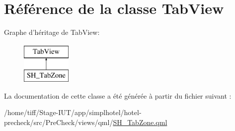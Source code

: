 \hypertarget{classTabView}{\section{Référence de la classe Tab\-View}
\label{classTabView}
}
Graphe d'héritage de Tab\-View\-:\begin{figure}[H]
\begin{center}
\leavevmode
\includegraphics[height=2.000000cm]{classTabView}
\end{center}
\end{figure}


La documentation de cette classe a été générée à partir du fichier suivant \-:\begin{DoxyCompactItemize}
\item 
/home/tiff/\-Stage-\/\-I\-U\-T/app/simplhotel/hotel-\/precheck/src/\-Pre\-Check/views/qml/\hyperlink{SH__TabZone_8qml}{S\-H\-\_\-\-Tab\-Zone.\-qml}\end{DoxyCompactItemize}
